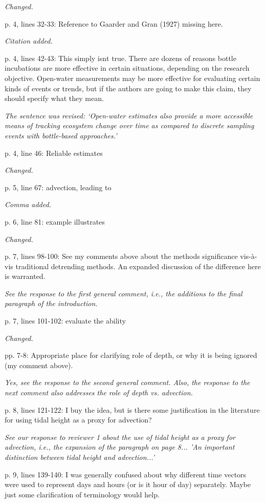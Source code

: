 \documentclass[letterpaper,12pt]{article}\usepackage[]{graphicx}\usepackage[]{color}
\begin{document}
{\it Changed.}

p. 4, lines 32-33: Reference to Gaarder and Gran (1927) missing here.

{\it Citation added.}

p. 4, lines 42-43: This simply isnt true. There are dozens of reasons bottle incubations are more effective in certain situations, depending on the research objective. Open-water measurements may be more effective for evaluating certain kinds of events or trends, but if the authors are going to make this claim, they should specify what they mean.

{\it The sentence was revised: `Open-water estimates also provide a more accessible means of tracking ecosystem change over time as compared to discrete sampling events with bottle-based approaches.'}

p. 4, line 46: Reliable estimates

{\it Changed.}

p. 5, line 67: advection, leading to

{\it Comma added.}

p. 6, line 81: example illustrates

{\it Changed.}

p. 7, lines 98-100: See my comments above about the methods significance vis-à-vis traditional detrending methods. An expanded discussion of the difference here is warranted.

{\it See the response to the first general comment, i.e., the additions to the final paragraph of the introduction.}

p. 7, lines 101-102: evaluate the ability

{\it Changed.}

pp. 7-8: Appropriate place for clarifying role of depth, or why it is being ignored (my comment above).

{\it Yes, see the response to the second general comment.  Also, the response to the next comment also addresses the role of depth vs. advection.}

p. 8, lines 121-122: I buy the idea, but is there some justification in the literature for using tidal height as a proxy for advection?

{\it See our response to reviewer 1 about the use of tidal height as a proxy for advection, i.e., the expansion of the paragraph on page 8... 'An important distinction between tidal height and advection...'}

p. 9, lines 139-140: I was generally confused about why different time vectors were used to represent days and hours (or is it hour of day) separately. Maybe just some clarification of terminology would help.
\end{document}
